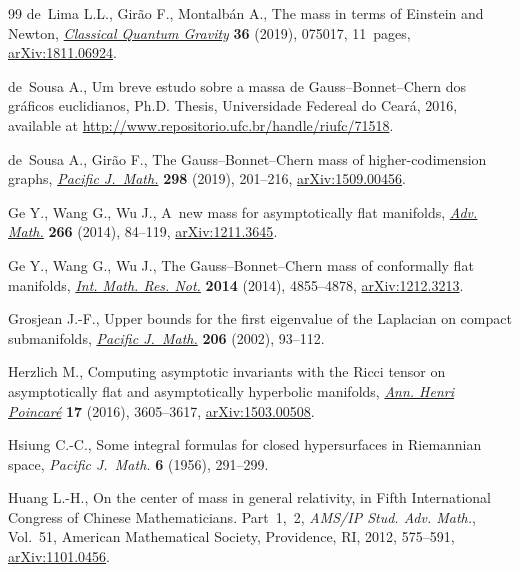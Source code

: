 \documentclass[pdftex]{sigma}
\numberwithin{equation}{section}
\begin{document}
\begin{thebibliography}{99}
de~Lima L.L., Gir\~ao F., Montalb\'an A., The mass in terms of {E}instein and
 {N}ewton, \href{https://doi.org/10.1088/1361-6382/ab090a}{\textit{Classical Quantum Gravity}} \textbf{36} (2019), 075017,
 11~pages, \href{https://arxiv.org/abs/1811.06924}{arXiv:1811.06924}.

de~Sousa A., Um breve estudo sobre a massa de {G}auss--{B}onnet--{C}hern dos
 gr\'aficos euclidianos, Ph.D. Thesis, {U}niversidade Federeal do Cear\'a,
 2016, available at \url{http://www.repositorio.ufc.br/handle/riufc/71518}.

de~Sousa A., Gir\~ao F., The {G}auss--{B}onnet--{C}hern mass of
 higher-codimension graphs, \href{https://doi.org/10.2140/pjm.2019.298.201}{\textit{Pacific J.~Math.}} \textbf{298} (2019),
 201--216, \href{https://arxiv.org/abs/1509.00456}{arXiv:1509.00456}.

Ge Y., Wang G., Wu J., A~new mass for asymptotically flat manifolds,
 \href{https://doi.org/10.1016/j.aim.2014.08.006}{\textit{Adv. Math.}} \textbf{266} (2014), 84--119, \href{https://arxiv.org/abs/1211.3645}{arXiv:1211.3645}.

Ge Y., Wang G., Wu J., The {G}auss--{B}onnet--{C}hern mass of conformally flat
 manifolds, \href{https://doi.org/10.1093/imrn/rnt095}{\textit{Int. Math. Res. Not.}} \textbf{2014} (2014), 4855--4878,
 \href{https://arxiv.org/abs/1212.3213}{arXiv:1212.3213}.

Grosjean J.-F., Upper bounds for the first eigenvalue of the {L}aplacian on
 compact submanifolds, \href{https://doi.org/10.2140/pjm.2002.206.93}{\textit{Pacific J.~Math.}} \textbf{206} (2002), 93--112.

Herzlich M., Computing asymptotic invariants with the {R}icci tensor on
 asymptotically flat and asymptotically hyperbolic manifolds, \href{https://doi.org/10.1007/s00023-016-0494-5}{\textit{Ann.
 Henri Poincar\'e}} \textbf{17} (2016), 3605--3617, \href{https://arxiv.org/abs/1503.00508}{arXiv:1503.00508}.

Hsiung C.-C., Some integral formulas for closed hypersurfaces in {R}iemannian
 space, \textit{Pacific J.~Math.} \textbf{6} (1956), 291--299.

Huang L.-H., On the center of mass in general relativity, in Fifth
 {I}nternational {C}ongress of {C}hinese {M}athematicians. {P}art~1,~2,
 \textit{AMS/IP Stud. Adv. Math.}, Vol.~51, American Mathematical Society,
 Providence, RI, 2012, 575--591, \href{https://arxiv.org/abs/1101.0456}{arXiv:1101.0456}.


\end{thebibliography}
\end{document}
